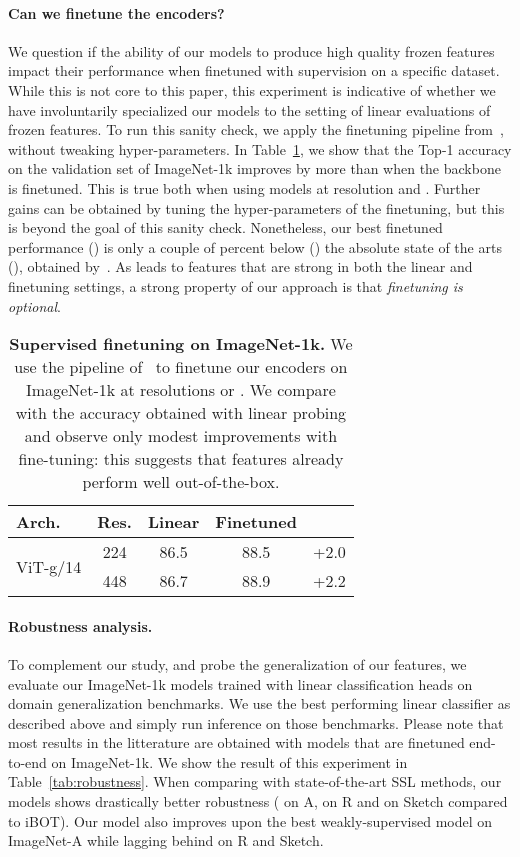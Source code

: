 \paragraph{Can we finetune the encoders?}
We question if the ability of our models to produce high quality frozen features impact their performance when finetuned with supervision on a specific dataset.
While this is not core to this paper, this experiment is indicative of whether we have involuntarily specialized our models to the setting of linear evaluations of frozen features.
To run this sanity check, we apply the finetuning pipeline from~\citet{touvron2022deit}, without tweaking hyper-parameters.
In Table~\ref{tab:ft-inet1k-alone}, we show that the Top-1 accuracy on the validation set of ImageNet-1k improves by more than  when the backbone is finetuned.
This is true both when using models at resolution  and .
Further gains can be obtained by tuning the hyper-parameters of the finetuning, but this is beyond the goal of this sanity check.
Nonetheless, our best finetuned performance () is only a couple of percent below () the absolute state of the arts (), obtained by~\citet{chen2023symbolic}.
As \OURS{} leads to features that are strong in both the linear and finetuning settings, a strong property of our approach is that \textit{finetuning is optional}.

\begin{table}[ht]
  \centering
  \begin{tabular}{@{}l cccc@{}}
    \toprule
     Arch. & Res. & Linear & Finetuned &  \\
    \midrule
     \multirow{2}{*}{ViT-g/14} & 224 & 86.5 & 88.5 & +2.0 \\
              & 448 & 86.7 & 88.9 & +2.2 \\
    \bottomrule
  \end{tabular}
  \caption{
    \textbf{Supervised finetuning on ImageNet-1k.}
    We use the pipeline of~\cite{touvron2022deit} to finetune our encoders on ImageNet-1k at resolutions  or . We compare with the accuracy obtained with linear probing and observe only modest improvements with fine-tuning: this suggests that \OURS{} features already perform well out-of-the-box.
  }
  \label{tab:ft-inet1k-alone}
\end{table}


\paragraph{Robustness analysis.}
To complement our study, and probe the generalization of our features, we evaluate our ImageNet-1k models trained with linear classification heads on domain generalization benchmarks.
We use the best performing linear classifier as described above and simply run inference on those benchmarks.
Please note that most results in the litterature are obtained with models that are finetuned end-to-end on ImageNet-1k.
We show the result of this experiment in Table~\ref{tab:robustness}.
When comparing with state-of-the-art SSL methods, our models shows drastically better robustness ( on A,  on R and  on Sketch compared to iBOT).
Our model also improves upon the best weakly-supervised model on ImageNet-A while lagging behind on R and Sketch.

